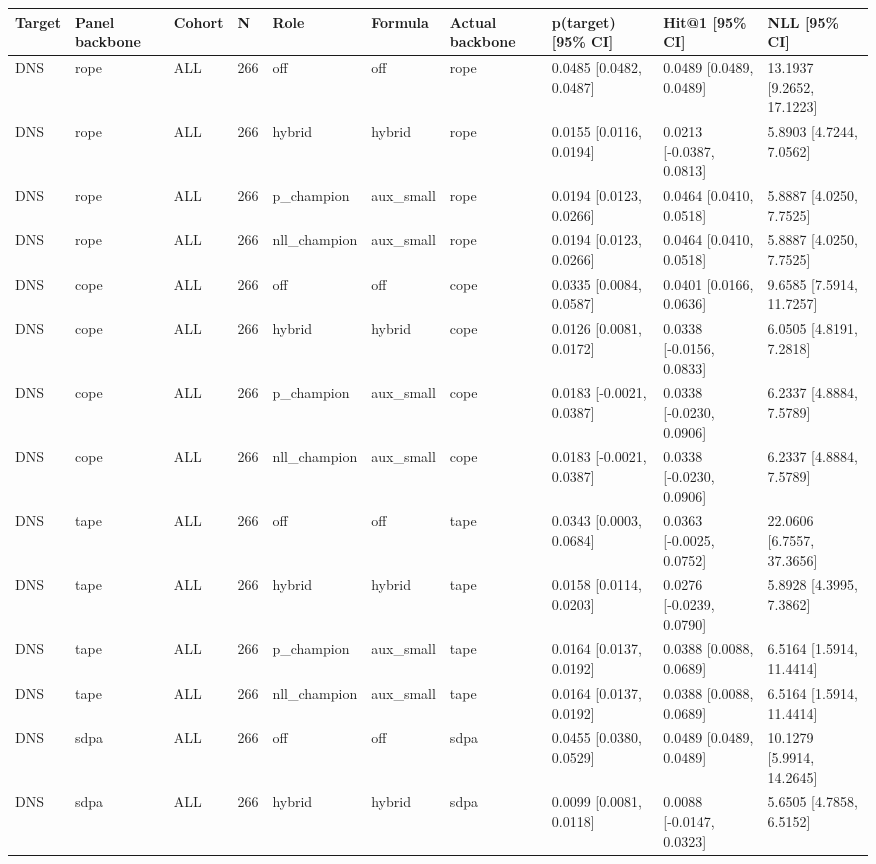 \begin{tabular}{llllllllll}
\hline
Target & Panel backbone & Cohort & N & Role & Formula & Actual backbone & p(target) [95\% CI] & Hit@1 [95\% CI] & NLL [95\% CI] \\
\hline
DNS & rope & ALL & 266 & off & off & rope & 0.0485 [0.0482, 0.0487] & 0.0489 [0.0489, 0.0489] & 13.1937 [9.2652, 17.1223] \\
DNS & rope & ALL & 266 & hybrid & hybrid & rope & 0.0155 [0.0116, 0.0194] & 0.0213 [-0.0387, 0.0813] & 5.8903 [4.7244, 7.0562] \\
DNS & rope & ALL & 266 & p\_champion & aux\_small & rope & 0.0194 [0.0123, 0.0266] & 0.0464 [0.0410, 0.0518] & 5.8887 [4.0250, 7.7525] \\
DNS & rope & ALL & 266 & nll\_champion & aux\_small & rope & 0.0194 [0.0123, 0.0266] & 0.0464 [0.0410, 0.0518] & 5.8887 [4.0250, 7.7525] \\
DNS & cope & ALL & 266 & off & off & cope & 0.0335 [0.0084, 0.0587] & 0.0401 [0.0166, 0.0636] & 9.6585 [7.5914, 11.7257] \\
DNS & cope & ALL & 266 & hybrid & hybrid & cope & 0.0126 [0.0081, 0.0172] & 0.0338 [-0.0156, 0.0833] & 6.0505 [4.8191, 7.2818] \\
DNS & cope & ALL & 266 & p\_champion & aux\_small & cope & 0.0183 [-0.0021, 0.0387] & 0.0338 [-0.0230, 0.0906] & 6.2337 [4.8884, 7.5789] \\
DNS & cope & ALL & 266 & nll\_champion & aux\_small & cope & 0.0183 [-0.0021, 0.0387] & 0.0338 [-0.0230, 0.0906] & 6.2337 [4.8884, 7.5789] \\
DNS & tape & ALL & 266 & off & off & tape & 0.0343 [0.0003, 0.0684] & 0.0363 [-0.0025, 0.0752] & 22.0606 [6.7557, 37.3656] \\
DNS & tape & ALL & 266 & hybrid & hybrid & tape & 0.0158 [0.0114, 0.0203] & 0.0276 [-0.0239, 0.0790] & 5.8928 [4.3995, 7.3862] \\
DNS & tape & ALL & 266 & p\_champion & aux\_small & tape & 0.0164 [0.0137, 0.0192] & 0.0388 [0.0088, 0.0689] & 6.5164 [1.5914, 11.4414] \\
DNS & tape & ALL & 266 & nll\_champion & aux\_small & tape & 0.0164 [0.0137, 0.0192] & 0.0388 [0.0088, 0.0689] & 6.5164 [1.5914, 11.4414] \\
DNS & sdpa & ALL & 266 & off & off & sdpa & 0.0455 [0.0380, 0.0529] & 0.0489 [0.0489, 0.0489] & 10.1279 [5.9914, 14.2645] \\
DNS & sdpa & ALL & 266 & hybrid & hybrid & sdpa & 0.0099 [0.0081, 0.0118] & 0.0088 [-0.0147, 0.0323] & 5.6505 [4.7858, 6.5152] \\

\end{tabular}
